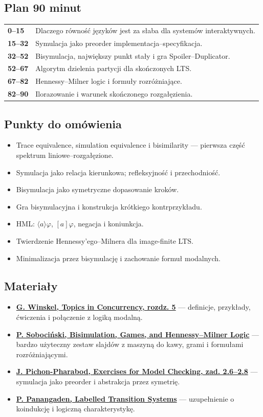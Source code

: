 \documentclass[11pt,a4paper]{article}
\newcommand{\material}[3]{\item \href{#2}{\textbf{#1}} --- #3}
\begin{document}
\subsection{Plan 90 minut}
\begin{center}\small\begin{tabularx}{0.96\textwidth}{@{}>{\bfseries}p{18mm}X@{}}
0--15 & Dlaczego równość języków jest za słaba dla systemów interaktywnych.\\
15--32 & Symulacja jako preorder implementacja--specyfikacja.\\
32--52 & Bisymulacja, największy punkt stały i gra Spoiler--Duplicator.\\
52--67 & Algorytm dzielenia partycji dla skończonych LTS.\\
67--82 & Hennessy--Milner logic i formuły rozróżniające.\\
82--90 & Ilorazowanie i warunek skończonego rozgałęzienia.\\
\end{tabularx}\end{center}

\subsection{Punkty do omówienia}
\begin{itemize}
\item Trace equivalence, simulation equivalence i bisimilarity --- pierwsza część spektrum liniowe--rozgałęzione.
\item Symulacja jako relacja kierunkowa; refleksyjność i przechodniość.
\item Bisymulacja jako symetryczne dopasowanie kroków.
\item Gra bisymulacyjna i konstrukcja krótkiego kontrprzykładu.
\item HML: $\langle a\rangle\varphi$, $[a]\varphi$, negacja i koniunkcja.
\item Twierdzenie Hennessy'ego--Milnera dla image-finite LTS.
\item Minimalizacja przez bisymulację i zachowanie formuł modalnych.
\end{itemize}

\subsection{Materiały}
\begin{itemize}
\material{G. Winskel, Topics in Concurrency, rozdz. 5}{https://www.cl.cam.ac.uk/teaching/1617/TopConc/TopicsConc-1617.pdf}{definicje, przykłady, ćwiczenia i połączenie z logiką modalną.}
\material{P. Sobociński, Bisimulation, Games, and Hennessy--Milner Logic}{https://web.cs.wpi.edu/~guttman/cs521_website/sobocinski_bisimulation-nup.pdf}{bardzo użyteczny zestaw slajdów z maszyną do kawy, grami i formułami rozróżniającymi.}
\material{J. Pichon-Pharabod, Exercises for Model Checking, zad. 2.6--2.8}{https://www.cl.cam.ac.uk/teaching/2425/HLog+ModC/part2-exercises.pdf}{symulacja jako preorder i abstrakcja przez symetrię.}
\material{P. Panangaden, Labelled Transition Systems}{https://www.cs.mcgill.ca/~prakash/Talks/lecture1.pdf}{uzupełnienie o koindukcję i logiczną charakterystykę.}
\end{itemize}
\end{document}
